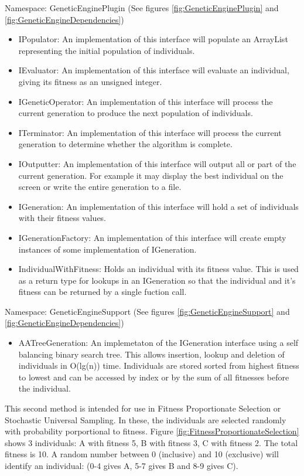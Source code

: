 Namespace: GeneticEnginePlugin (See figures \ref{fig:GeneticEnginePlugin} and \ref{fig:GeneticEngineDependencies})
\begin{itemize}
\item IPopulator: An implementation of this interface will populate an ArrayList representing the initial population of individuals.
\item IEvaluator: An implementation of this interface will evaluate an individual, giving its fitness as an unsigned integer.
\item IGeneticOperator: An implementation of this interface will process the current generation to produce the next population of individuals.
\item ITerminator: An implementation of this interface will  process the current generation to determine whether the algorithm is complete.
\item IOutputter: An implementation of this interface will  output all or part of the current generation. For example it may display the best individual on the screen or write the entire generation to a file.
\item IGeneration: An implementation of this interface will hold a set of individuals with their fitness values.
\item IGenerationFactory: An implementation of this interface will create empty instances of some implementation of IGeneration.
\item IndividualWithFitness: Holds an individual with its fitness value. This is used as a return type for lookups in an IGeneration so that the individual and it's fitness can be returned by a single fuction call.
\end{itemize}

Namespace: GeneticEngineSupport (See figures \ref{fig:GeneticEngineSupport} and \ref{fig:GeneticEngineDependencies})
\begin{itemize}
\item AATreeGeneration: An implemetaton of the IGeneration interface using a self balancing binary search tree. This allows insertion, lookup and deletion of individuals in O(lg(n)) time. Individuals are stored sorted from highest fitness to lowest and can be accessed by index or by the sum of all fitnesses before the individual. 
\end{itemize}

This second method is intended for use in Fitness Proportionate Selection or Stochastic Universal Sampling. In these, the individuals are selected randomly with probability porportional to fitness. Figure \ref{fig:FitnessProportionateSelection} shows 3 individuals: A with fitness 5, B with fitness 3, C with fitness 2. The total fitness is 10. A random number between 0 (inclusive) and 10 (exclusive) will identify an individual: (0-4 gives A, 5-7 gives B and 8-9 gives C).

